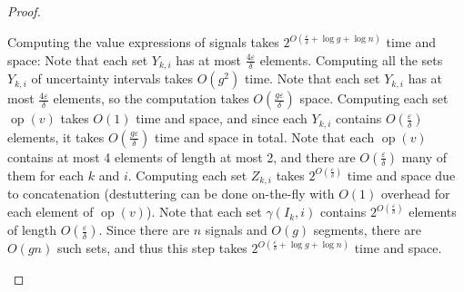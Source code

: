\begin{proof}
\begin{enumerate}
		
		Computing the value expressions of signals takes $2^{O(\frac{\varepsilon}{\delta} + \log g + \log n)}$ time and space:
		Note that each set $Y_{k,i}$ has at most $\frac{4 \varepsilon}{\delta}$ elements. %
		Computing all the sets $Y_{k,i}$ of uncertainty intervals takes $O(g^2)$ time.
		Note that each set $Y_{k,i}$ has at most $\frac{4 \varepsilon}{\delta}$ elements, so the computation takes $O(\frac{g \varepsilon}{\delta})$ space.
		Computing each set $\operatorname{op}(v)$ takes $O(1)$ time and space, and since each $Y_{k,i}$ contains $O(\frac{\varepsilon}{\delta})$ elements, it takes $O(\frac{g \varepsilon}{\delta})$ time and space in total.
		Note that each $\operatorname{op}(v)$ contains at most 4 elements of length at most 2, and there are $O(\frac{\varepsilon}{\delta})$ many of them for each $k$ and $i$.
		Computing each set $Z_{k,i}$ takes $2^{O(\frac{\varepsilon}{\delta})}$ time and space due to concatenation (destuttering can be done on-the-fly with $O(1)$ overhead for each element of $\operatorname{op}(v)$). %
		Note that each set $\gamma(I_k, i)$ contains $2^{O(\frac{\varepsilon}{\delta})}$ elements of length $O(\frac{\varepsilon}{\delta})$.
		Since there are $n$ signals and $O(g)$ segments, there are $O(gn)$ such sets, and thus this step takes $2^{O(\frac{\varepsilon}{\delta} + \log g + \log n)}$ time and space. 
	
		

\end{enumerate}
\end{proof}
